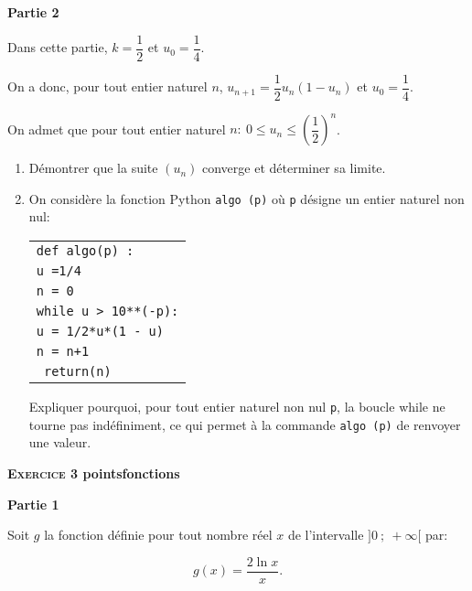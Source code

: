 \documentclass[10pt,a4paper]{article}
\begin{document}
\bigskip

\textbf{Partie 2}

\medskip

Dans cette partie, $k= \dfrac12$  et $u_0 = \dfrac14$.

On a donc, pour tout entier naturel $n$,\: $u_{n+1} = \dfrac12 u_n \left(1 - u_n\right)$ et $u_0 = \dfrac14$.

On admet que pour tout entier naturel $n :\: 0 \leqslant u_n \leqslant \left(\dfrac12\right)^n$.

\medskip

\begin{enumerate}
\item Démontrer que la suite $\left(u_n\right)$ converge et déterminer sa limite.
\item On considère la fonction Python \texttt{algo (p)} où \texttt{p} désigne un entier naturel non nul:

\begin{center}
\begin{tabular}{|l|}\hline
\texttt{def algo(p) :}\\
\quad  \texttt{u =1/4}\\
\quad \texttt{n = 0}\\
\quad \texttt{while u > 10**(-p):}\\
\quad \quad \texttt{u = 1/2*u*(1 - u)}\\
\quad \quad \texttt{n = n+1}\\
\quad \texttt{ return(n)}\\ \hline
\end{tabular}
\end{center}
Expliquer pourquoi, pour tout entier naturel non nul \texttt{p}, la boucle while ne tourne pas indéfiniment, ce qui permet à la commande \texttt{algo (p)} de renvoyer une valeur.
\end{enumerate}

\bigskip

\textbf{\textsc{Exercice 3}  points\hfill fonctions}

\bigskip

\textbf{Partie 1}

\medskip

Soit $g$ la fonction définie pour tout nombre réel $x$ de l'intervalle $]0~;~+ \infty[$ par:

\[g(x) = \dfrac{2 \ln x}{ x}.\]

\smallskip
\end{document}
